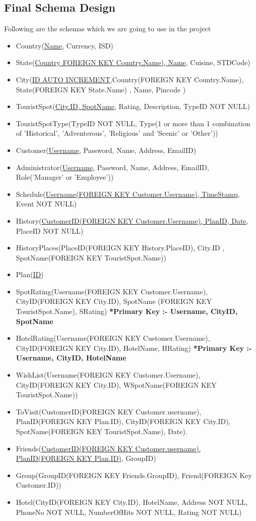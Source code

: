 \documentclass[a4paper,11pt]{article}
\begin{document}
\subsection{Final Schema Design}
Following are the schemas which we are going to use in the project
\begin{itemize}
\item Country(\underline{Name}, Currency, ISD)
\item State(\underline{Country FOREIGN KEY Country.Name), Name}, Cuisine, STDCode)
\item City(\underline{ID AUTO INCREMENT},Country(FOREIGN KEY Country.Name), State(FOREIGN KEY State.Name) , Name, Pincode )
\item TouristSpot(\underline{City.ID, SpotName}, Rating, Description, TypeID NOT NULL)
\item TouristSpotType(TypeID NOT NULL, Type(1 or more than 1 combination of 'Historical', 'Adventerous', 'Religious' and 'Scenic' or 'Other'))
\item Customer(\underline{Username}, Password, Name, Address, EmailID)
\item Administrator(\underline{Username}, Password, Name, Address, EmailID, Role('Manager' or 'Employee'))
\item Schedule(\underline{Username(FOREIGN KEY Customer.Username), TimeStamp}, Event NOT NULL)
\item History(\underline{CustomerID(FOREIGN KEY Customer.Username), PlanID, Date}, PlaceID NOT NULL)
\item HistoryPlaces(PlaceID(FOREIGN KEY History.PlaceID), City.ID , SpotName(FOREIGN KEY TouristSpot.Name))
\item Plan(\underline{ID})
\item SpotRating(Username(FOREIGN KEY Customer.Username), CityID(FOREIGN KEY City.ID), SpotName (FOREIGN KEY TouristSpot.Name), SRating)
\newline \textbf{*Primary Key :- Username, CityID, SpotName}
\item HotelRating(Username(FOREIGN KEY Customer.Username), CityID(FOREIGN KEY City.ID), HotelName, HRating)
\newline \textbf{*Primary Key :- Username, CityID, HotelName}
\item WishList(Username(FOREIGN KEY Customer.Username), CityID(FOREIGN KEY City.ID), WSpotName(FOREIGN KEY TouristSpot.Name))
\item ToVisit(CustomerID(FOREIGN KEY Customer.username), PlanID(FOREIGN KEY Plan.ID), CityID(FOREIGN KEY City.ID), SpotName(FOREIGN KEY TouristSpot.Name), Date).
\item Friends(\underline{CustomerID(FOREIGN KEY Customer.username), PlanID(FOREIGN KEY Plan.ID)}, GroupID)
\item Group(GroupID(FOREIGN KEY Friends.GroupID), Friend(FOREIGN Key Customer.ID))
\item Hotel(CityID(FOREIGN KEY City.ID), HotelName, Address NOT NULL, PhoneNo NOT NULL, NumberOfHits NOT NULL, Rating NOT NULL)
\end{itemize}
\end{document}
